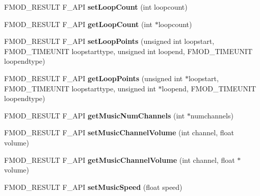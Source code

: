 \begin{DoxyCompactItemize}
\item 
F\+M\+O\+D\+\_\+\+R\+E\+S\+U\+LT F\+\_\+\+A\+PI {\bfseries set\+Loop\+Count} (int loopcount)\hypertarget{class_f_m_o_d_1_1_sound_af5da99ae0aff53b50910a36e3510d7ba}{}\label{class_f_m_o_d_1_1_sound_af5da99ae0aff53b50910a36e3510d7ba}

\item 
F\+M\+O\+D\+\_\+\+R\+E\+S\+U\+LT F\+\_\+\+A\+PI {\bfseries get\+Loop\+Count} (int $\ast$loopcount)\hypertarget{class_f_m_o_d_1_1_sound_a8ed3b79d45f937d215a84e52c2be4891}{}\label{class_f_m_o_d_1_1_sound_a8ed3b79d45f937d215a84e52c2be4891}

\item 
F\+M\+O\+D\+\_\+\+R\+E\+S\+U\+LT F\+\_\+\+A\+PI {\bfseries set\+Loop\+Points} (unsigned int loopstart, F\+M\+O\+D\+\_\+\+T\+I\+M\+E\+U\+N\+IT loopstarttype, unsigned int loopend, F\+M\+O\+D\+\_\+\+T\+I\+M\+E\+U\+N\+IT loopendtype)\hypertarget{class_f_m_o_d_1_1_sound_ae4ed822496a4bd387e8384aec67e33f9}{}\label{class_f_m_o_d_1_1_sound_ae4ed822496a4bd387e8384aec67e33f9}

\item 
F\+M\+O\+D\+\_\+\+R\+E\+S\+U\+LT F\+\_\+\+A\+PI {\bfseries get\+Loop\+Points} (unsigned int $\ast$loopstart, F\+M\+O\+D\+\_\+\+T\+I\+M\+E\+U\+N\+IT loopstarttype, unsigned int $\ast$loopend, F\+M\+O\+D\+\_\+\+T\+I\+M\+E\+U\+N\+IT loopendtype)\hypertarget{class_f_m_o_d_1_1_sound_a6528c2344a8f4b87c1f48bc02a829fc5}{}\label{class_f_m_o_d_1_1_sound_a6528c2344a8f4b87c1f48bc02a829fc5}

\item 
F\+M\+O\+D\+\_\+\+R\+E\+S\+U\+LT F\+\_\+\+A\+PI {\bfseries get\+Music\+Num\+Channels} (int $\ast$numchannels)\hypertarget{class_f_m_o_d_1_1_sound_ae5af50e5bdaec640dceb9a797c75fa99}{}\label{class_f_m_o_d_1_1_sound_ae5af50e5bdaec640dceb9a797c75fa99}

\item 
F\+M\+O\+D\+\_\+\+R\+E\+S\+U\+LT F\+\_\+\+A\+PI {\bfseries set\+Music\+Channel\+Volume} (int channel, float volume)\hypertarget{class_f_m_o_d_1_1_sound_ab5dc7c5f81b8301d9ea74bd0c0d00c49}{}\label{class_f_m_o_d_1_1_sound_ab5dc7c5f81b8301d9ea74bd0c0d00c49}

\item 
F\+M\+O\+D\+\_\+\+R\+E\+S\+U\+LT F\+\_\+\+A\+PI {\bfseries get\+Music\+Channel\+Volume} (int channel, float $\ast$volume)\hypertarget{class_f_m_o_d_1_1_sound_afc1ef61ba84190294a6b1f1f0fd3ab64}{}\label{class_f_m_o_d_1_1_sound_afc1ef61ba84190294a6b1f1f0fd3ab64}

\item 
F\+M\+O\+D\+\_\+\+R\+E\+S\+U\+LT F\+\_\+\+A\+PI {\bfseries set\+Music\+Speed} (float speed)\hypertarget{class_f_m_o_d_1_1_sound_af5fe3deac71212ab13531a7bec20c918}{}\label{class_f_m_o_d_1_1_sound_af5fe3deac71212ab13531a7bec20c918}


\end{DoxyCompactItemize}
